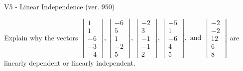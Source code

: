 \begin{exercise}
  \begin{exerciseTitle}V5 - Linear Independence (ver. 950)\end{exerciseTitle}
  \begin{exerciseStatement}
    Explain why the vectors \(\left[\begin{array}{r}
1 \\
1 \\
-6 \\
-3 \\
-4
\end{array}\right] , \left[\begin{array}{r}
-6 \\
5 \\
1 \\
-2 \\
5
\end{array}\right] , \left[\begin{array}{r}
-2 \\
3 \\
-1 \\
-1 \\
2
\end{array}\right] , \left[\begin{array}{r}
-5 \\
1 \\
-6 \\
4 \\
5
\end{array}\right] , \text{ and } \left[\begin{array}{r}
-2 \\
-2 \\
12 \\
6 \\
8
\end{array}\right]\) are linearly dependent or linearly independent.	



\end{exerciseStatement}
\end{exercise}
